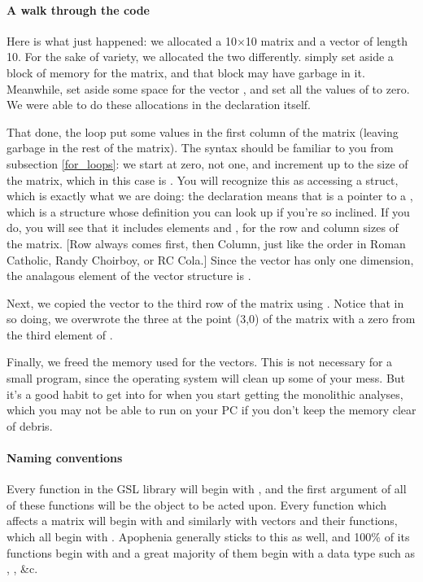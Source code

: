 \paragraph{A walk through the code}
Here is what just happened: we allocated a 10$\times$10 matrix and a vector of
length 10.  For the sake of variety, we  allocated the two differently.
 simply set aside a block of memory for the matrix,
and that block may have garbage in it. Meanwhile,  set
aside some space for the vector , and set all the values of  to
zero.  We were able to do these allocations in the declaration itself.

That done, the  loop put some values in the first column of the matrix (leaving garbage in the rest of the matrix). 
The syntax should be familiar to you from subsection \ref{for_loops}: we start at
zero, not one, and increment up to the size of the matrix, which in this case is
. You will recognize this as accessing a struct, which is exactly
what we are doing: the declaration  means that  is a
pointer to a , which is a structure whose definition you can
look up if you're so inclined. If you do, you will see that it includes 
elements  and , for the row and column sizes of the
matrix. [Row always comes first, then Column, just like the order in Roman Catholic, 
Randy Choirboy, or RC Cola.] Since the vector has only one dimension, the analagous element
of the vector structure is .

Next, we copied the vector to the third row of the matrix using . Notice that in so doing, we
overwrote the three at the point (3,0) of the matrix with a zero from
the third element of .

Finally, we freed the memory used for the vectors. This is not 
necessary for a small program, since the operating system
will clean up some of your mess. But it's a good habit to get into for
when you start getting the monolithic analyses, which you may not be
able to run on your PC if you don't keep the memory clear of debris.

\paragraph{Naming conventions}  
Every function in the GSL library will begin with , and
the first argument of all of these functions will be the object to be acted upon.
Every function which affects a matrix will begin with 
and similarly with vectors and their functions, which all begin with . 
Apophenia generally sticks to this as well, and 100\% of its functions
begin with  and a great majority of them begin with a data
type such as , , \&c.

